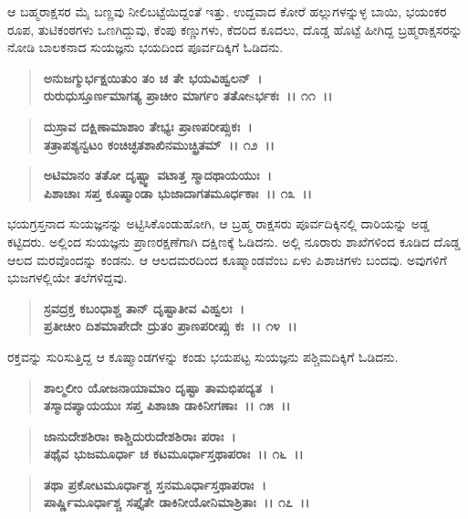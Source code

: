 ಆ ಬಹ್ಮರಾಕ್ಷಸರ ಮೈ ಬಣ್ಣವು ನೀಲಿಬಟ್ಟೆಯಿದ್ದಂತೆ ಇತ್ತು. ಉದ್ದವಾದ ಕೋರೆ ಹಲ್ಲುಗಳನ್ನುಳ್ಳ ಬಾಯಿ, ಭಯಂಕರ ರೂಪ, ತುಟಿಕಂಠಗಳು ಒಣಗಿದ್ದುವು, ಕೆಂಪು ಕಣ್ಣುಗಳು, ಕೆದರಿದ ಕೂದಲು, ದೊಡ್ಡ ಹೊಟ್ಟೆ ಹೀಗಿದ್ದ ಬ್ರಹ್ಮರಾಕ್ಷಸರನ್ನು ನೋಡಿ ಬಾಲಕನಾದ ಸುಯಜ್ಞನು ಭಯದಿಂದ ಪೂರ್ವದಿಕ್ಕಿಗೆ ಓಡಿದನು.

\begin{verse}
\textbf{ಅನುಜಗ್ಮುರ್ಭಕ್ಷಯಿತುಂ ತಂ ಚ ತೇ ಭಯವಿಹ್ವಲನ್~।}\\\textbf{ರುರುಧುಸ್ತೂರ್ಣಮಾಗತ್ಯ ಪ್ರಾಚೀಂ ಮಾರ್ಗಂ ತತೋsರ್ಭಕಃ~।। ೧೧~।। }
\end{verse}

\begin{verse}
\textbf{ದುಸ್ರಾವ ದಕ್ಷಿಣಾಮಾಶಾಂ ತೇಭ್ಯಃ ಪ್ರಾಣಪರೀಪ್ಸುಕಃ~।}\\\textbf{ತತ್ರಾಪಶ್ಯನ್ವಟಂ ಕಂಚಿಚ್ಛತಶಾಖಿನಮುಚ್ಛ್ರಿತಮ್~।। ೧೨~।। }
\end{verse}

\begin{verse}
\textbf{ಅಟಿಮಾನಂ ತತೋ ದೃಷ್ಟ್ವಾ ವಟಾತ್ತ ಸ್ಮಾದಥಾಯಯುಃ~।}\\\textbf{ಪಿಶಾಚಾಃ ಸಪ್ತ ಕೂಷ್ಮಾಂಡಾ ಭುಜಾದಾಗತಮೂರ್ಧಕಾಃ~।। ೧೩~।।}
\end{verse}

ಭಯಗ್ರಸ್ತನಾದ ಸುಯಜ್ಞನನ್ನು ಅಟ್ಟಿಸಿಕೊಂಡುಹೋಗಿ, ಆ ಬ್ರಹ್ಮ ರಾಕ್ಷಸರು ಪೂರ್ವದಿಕ್ಕಿನಲ್ಲಿ ದಾರಿಯನ್ನು ಅಡ್ಡ ಕಟ್ಟಿದರು. ಅಲ್ಲಿಂದ ಸುಯಜ್ಞನು ಪ್ರಾಣರಕ್ಷಣೆಗಾಗಿ ದಕ್ಷಿಣಕ್ಕೆ ಓಡಿದನು. ಅಲ್ಲಿ ನೂರಾರು ಶಾಖೆಗಳಿಂದ ಕೂಡಿದ ದೊಡ್ಡ ಆಲದ ಮರವೊಂದನ್ನು ಕಂಡನು. ಆ ಆಲದಮರದಿಂದ ಕೂಷ್ಮಾಂಡವೆಂಬ ಏಳು ಪಿಶಾಚಿಗಳು ಬಂದವು. ಅವುಗಳಿಗೆ ಭುಜಗಳಲ್ಲಿಯೇ ತಲೆಗಳಿದ್ದವು.

\begin{verse}
\textbf{ಸ್ರವದ್ರಕ್ತ ಕಬಂಧಾಶ್ಚ ತಾನ್ ದೃಷ್ಟಾತೀವ ವಿಹ್ವಲಃ~।}\\\textbf{ಪ್ರತೀಚೀಂ ದಿಶಮಾಪೇದೇ ದ್ರುತಂ ಪ್ರಾಣಪರೀಪ್ಸು ಕಃ~।। ೧೪~।।}
\end{verse}

ರಕ್ತವನ್ನು ಸುರಿಸುತ್ತಿದ್ದ ಆ ಕೂಷ್ಮಾಂಡಗಳನ್ನು ಕಂಡು ಭಯಪಟ್ಟ ಸುಯಜ್ಞನು ಪಶ್ಚಿಮದಿಕ್ಕಿಗೆ ಓಡಿದನು.

\begin{verse}
\textbf{ಶಾಲ್ಮಲೀಂ ಯೋಜನಾಯಾಮಾಂ ದೃಷ್ಟಾ ತಾಮಭಿಪದ್ಯತ~।}\\\textbf{ತಸ್ಮಾದಪ್ಯಾಯಯುಃ ಸಪ್ತ ಪಿಶಾಚಾ ಡಾಕಿನೀಗಣಾಃ~।। ೧೫~।। }
\end{verse}

\begin{verse}
\textbf{ಜಾನುದೇಶಶಿರಾಃ ಕಾಶ್ಚಿದುರುದೇಶಶಿರಾಃ ಪರಾಃ~।}\\\textbf{ತಥೈವ ಭುಜಮೂರ್ಧಾ ಚ ಕಟಮೂರ್ಧಾಸ್ತಥಾಪರಾಃ~।। ೧೬~।।} 
\end{verse}

\begin{verse}
\textbf{ತಥಾ ಪ್ರಕೋಟಮೂರ್ಧಾಶ್ಚ ಸ್ತನಮೂರ್ಧಾಸ್ತಥಾಪರಾಃ~।}\\\textbf{ಪಾರ್ಷ್ಣಿಮೂರ್ಧಾಶ್ಚ ಸಪ್ತೈತೇ ಡಾಕಿನೀಯೋನಿಮಾಶ್ರಿತಾಃ~।। ೧೭~।।}
\end{verse}


